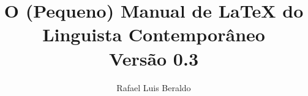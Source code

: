 \documentclass[openany,a4paper]{book}
\author{Rafael Luis Beraldo}
\title{
	{\Large O (Pequeno) Manual de \LaTeX{} do Linguista Contemporâneo} \\
	{\small Versão 0.3}
}
\begin{document}
\maketitle
\tableofcontents
%








\printglossaries

\end{document}
